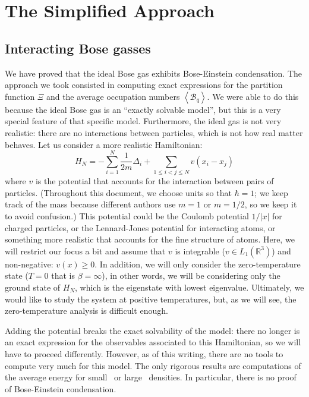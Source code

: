 \documentclass{ian}
\begin{document}
\section{The Simplified Approach}\label{sec:simplified}
\subsection{Interacting Bose gasses}
\indent
We have proved that the ideal Bose gas exhibits Bose-Einstein condensation.
The approach we took consisted in computing exact expressions for the partition function $\Xi$ and the average occupation numbers $\left<\mathcal B_q\right>$.
We were able to do this because the ideal Bose gas is an ``exactly solvable model'', but this is a very special feature of that specific model.
Furthermore, the ideal gas is not very realistic: there are no interactions between particles, which is not how real matter behaves.
Let us consider a more realistic Hamiltonian:
\begin{equation}
  H_N=-\sum_{i=1}^N\frac1{2m}\Delta_{i}+\sum_{1\leqslant i<j\leqslant N}v(x_i-x_j)
  \label{Ham}
\end{equation}
where $v$ is the potential that accounts for the interaction between pairs of particles.
(Throughout this document, we choose units so that $\hbar=1$; we keep track of the mass because different authors use $m=1$ or $m=1/2$, so we keep it to avoid confusion.)
This potential could be the Coulomb potential $1/|x|$ for charged particles, or the Lennard-Jones potential for interacting atoms, or something more realistic that accounts for the fine structure of atoms.
Here, we will restrict our focus a bit and assume that $v$ is integrable ($v\in L_1(\mathbb R^3)$) and non-negative: $v(x)\geqslant 0$.
In addition, we will only consider the zero-temperature state ($T=0$ that is $\beta=\infty$), in other words, we will be considering only the ground state of $H_N$, which is the eigenstate with lowest eigenvalue.
Ultimately, we would like to study the system at positive temperatures, but, as we will see, the zero-temperature analysis is difficult enough.
\bigskip

\indent
Adding the potential breaks the exact solvability of the model: there no longer is an exact expression for the observables associated to this Hamiltonian, so we will have to proceed differently.
However, as of this writing, there are no tools to compute very much for this model.
The only rigorous results are computations of the average energy for small\-~\cite{YY09,FS20} or large\-~\cite{Li63} densities.
In particular, there is no proof of Bose-Einstein condensation.
\bigskip
\end{document}
